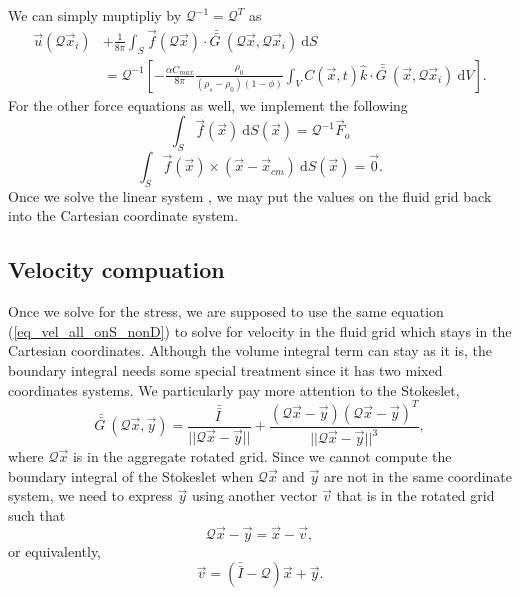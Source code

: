We can simply muptipliy by $\mathcal{Q}^{-1} = \mathcal{Q}^{T}$ as 
\begin{align}
	\vec{u} \left(\mathcal{Q} \vec{x}_i \right) 
		  & + \frac{1}{8 \pi} \int_{S}  
		 \vec{f}(\mathcal{Q} \vec{x}) 
		 \cdot \bar{\bar{G \ }} (\mathcal{Q} \vec{x},\mathcal{Q}\vec{x}_i) 
		 \ \textrm{d}S
		 \nonumber \\ & =
		 \mathcal{Q}^{-1}
		 \left[
		 - \frac{ \alpha C_{max}}{8\pi } \frac{\rho_0}{(\rho_s - \rho_0)(1-\phi)}
		 \int_V  C \left(\vec{x} ,t \right) \hat{k} \cdot
		 \bar{\bar{G \ }}(\vec{x}, \mathcal{Q} \vec{x}_i)
		 \ \text{d}V
		 \right].
	\label{eq_slp_vol_R}
\end{align}
For the other force equations as well, we implement the following
\begin{equation}
	\int_{S} \vec{f}(\vec{x}) \  \text{d}S(\vec{x})
	= \mathcal{Q}^{-1} \vec{F}_o
	 \label{eq_drag_code}
	 \end{equation} 
	 \begin{equation}
		 \int_S \vec{f} (\vec{x})  \times (\vec{x} - \vec{x}_{cm}) 
		 \ \textrm{d}S(\vec{x}) 
		 = \vec{0}.
	 \label{eq_torque_code}
	 \end{equation}
Once we solve the linear system ,
 we may put the values on the fluid grid back into the Cartesian coordinate system.
\subsection{Velocity compuation}
Once we solve for the stress, we are supposed to use the same 
equation (\ref{eq_vel_all_onS_nonD}) 
to solve for velocity in the fluid grid which stays in the Cartesian coordinates.
Although the volume integral term can stay as it is,  
the boundary integral needs some special treatment
since it has two mixed coordinates systems.
We particularly pay more attention to the Stokeslet,
\[
	\bar{\bar{G \ }} (\mathcal{Q}\vec{x},\vec{y}) 
	= 
	\frac{\bar{\bar{I \ }}}{||\mathcal{Q}\vec{x}-\vec{y} ||} 
	+ \frac{(\mathcal{Q}\vec{x}-\vec{y})(\mathcal{Q}\vec{x}-\vec{y})^T}{||\mathcal{Q}\vec{x}-\vec{y} ||^3}, 	 
\]
where $\mathcal{Q}\vec{x}$ is in the aggregate rotated grid. Since we cannot compute the boundary integral of the Stokeslet when $\mathcal{Q}\vec{x}$ and $\vec{y}$ are not in the same coordinate system, we need to express $\vec{y}$ using another vector $\vec{v}$ that is in the rotated grid such that 
\[
	\mathcal{Q}\vec{x} - \vec{y} = \vec{x} - \vec{v},
\]
or equivalently,
\[
	\vec{v} = \left(   \bar{\bar{I}} - \mathcal{Q} \right) \vec{x}  + \vec{y}.
\]

